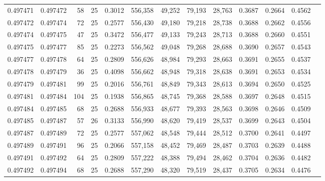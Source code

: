 \begin{tabular}{rrrrrrrrrrrrr}
0.497471 & 0.497472 &    58 &  25 &                                     0.3012 & 556,358 &  49,252 &  79,193 &  28,763 & 0.3687 & 0.2664 & 0.4562 \\
0.497472 & 0.497474 &    72 &  25 &                                     0.2577 & 556,430 &  49,180 &  79,218 &  28,738 & 0.3688 & 0.2662 & 0.4556 \\
0.497474 & 0.497475 &    47 &  25 &                                     0.3472 & 556,477 &  49,133 &  79,243 &  28,713 & 0.3688 & 0.2660 & 0.4551 \\
0.497475 & 0.497477 &    85 &  25 &                                     0.2273 & 556,562 &  49,048 &  79,268 &  28,688 & 0.3690 & 0.2657 & 0.4543 \\
0.497477 & 0.497478 &    64 &  25 &                                     0.2809 & 556,626 &  48,984 &  79,293 &  28,663 & 0.3691 & 0.2655 & 0.4537 \\
0.497478 & 0.497479 &    36 &  25 &                                     0.4098 & 556,662 &  48,948 &  79,318 &  28,638 & 0.3691 & 0.2653 & 0.4534 \\
0.497479 & 0.497481 &    99 &  25 &                                     0.2016 & 556,761 &  48,849 &  79,343 &  28,613 & 0.3694 & 0.2650 & 0.4525 \\
0.497481 & 0.497484 &   104 &  25 &                                     0.1938 & 556,865 &  48,745 &  79,368 &  28,588 & 0.3697 & 0.2648 & 0.4515 \\
0.497484 & 0.497485 &    68 &  25 &                                     0.2688 & 556,933 &  48,677 &  79,393 &  28,563 & 0.3698 & 0.2646 & 0.4509 \\
0.497485 & 0.497487 &    57 &  26 &                                     0.3133 & 556,990 &  48,620 &  79,419 &  28,537 & 0.3699 & 0.2643 & 0.4504 \\
0.497487 & 0.497489 &    72 &  25 &                                     0.2577 & 557,062 &  48,548 &  79,444 &  28,512 & 0.3700 & 0.2641 & 0.4497 \\
0.497489 & 0.497491 &    96 &  25 &                                     0.2066 & 557,158 &  48,452 &  79,469 &  28,487 & 0.3703 & 0.2639 & 0.4488 \\
0.497491 & 0.497492 &    64 &  25 &                                     0.2809 & 557,222 &  48,388 &  79,494 &  28,462 & 0.3704 & 0.2636 & 0.4482 \\
0.497492 & 0.497494 &    68 &  25 &                                     0.2688 & 557,290 &  48,320 &  79,519 &  28,437 & 0.3705 & 0.2634 & 0.4476 \\

\end{tabular}
